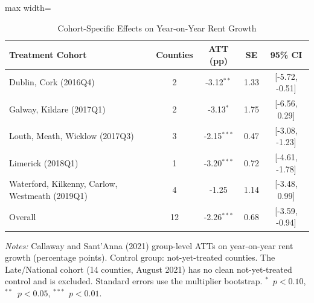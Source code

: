 \begin{table}[t]
\centering
\caption{Cohort-Specific Effects on Year-on-Year Rent Growth}
\label{tab:cohort}
\begin{adjustbox}{max width=\textwidth}
\begin{tabular}{lcccc}
\toprule
Treatment Cohort & Counties & ATT (pp) & SE & 95\% CI \\
\midrule
Dublin, Cork (2016Q4) & 2 & -3.12$^{**}$ & 1.33 & [-5.72, -0.51] \\
Galway, Kildare (2017Q1) & 2 & -3.13$^{*}$ & 1.75 & [-6.56, 0.29] \\
Louth, Meath, Wicklow (2017Q3) & 3 & -2.15$^{***}$ & 0.47 & [-3.08, -1.23] \\
Limerick (2018Q1) & 1 & -3.20$^{***}$ & 0.72 & [-4.61, -1.78] \\
Waterford, Kilkenny, Carlow, Westmeath (2019Q1) & 4 & -1.25 & 1.14 & [-3.48, 0.99] \\
\midrule
Overall & 12 & -2.26$^{***}$ & 0.68 & [-3.59, -0.94] \\
\bottomrule
\end{tabular}
\end{adjustbox}
\par\vspace{0.3em}\begin{minipage}{\textwidth}\footnotesize
\textit{Notes:} Callaway and Sant'Anna (2021) group-level ATTs on year-on-year rent growth (percentage points). Control group: not-yet-treated counties. The Late/National cohort (14 counties, August 2021) has no clean not-yet-treated control and is excluded. Standard errors use the multiplier bootstrap. $^{*}$~$p<0.10$, $^{**}$~$p<0.05$, $^{***}$~$p<0.01$.
\end{minipage}
\end{table}

